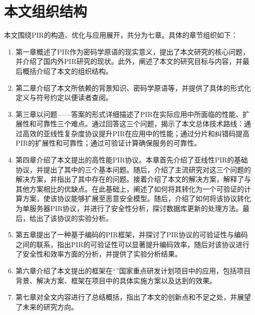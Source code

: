 \section{本文组织结构}

本文围绕PIR的构造、优化与应用展开，共分为七章。具体的章节组织如下：
\begin{enumerate}
    \item 第一章概述了PIR作为密码学原语的现实意义，提出了本文研究的核心问题，并介绍了国内外PIR研究的现状。此外，阐述了本文的研究目标与内容，并最后概括介绍了本文的组织结构。
    \item 第二章介绍了本文所依赖的背景知识、密码学原语等，并提供了具体的形式化定义与符号约定以便读者查阅。
    \item 第三章以问题——答案的形式详细描述了PIR在实际应用中所面临的性能、扩展性和可靠性三个难点。通过回答这三个问题，揭示了本文总体技术路线：通过高效的亚线性复杂度协议提升PIR在应用中的性能；通过分片和纠错码提高PIR的扩展性和可靠性；通过可验证计算确保服务的可靠性。
    \item 第四章介绍了本文提出的高性能PIR协议。本章首先介绍了亚线性PIR的基础协议，并提出了其中的三个基本问题。随后，介绍了主流研究对这三个问题的解决方案，并指出了其中存在的问题。接着介绍了本文的解决方案，解释了与其他方案相比的优缺点。在此基础上，阐述了如何将其转化为一个可验证的计算方案，使该协议能够扩展至恶意安全模型。随后，介绍了如何将该协议转化为单服务器PIR协议，并进行了安全性分析，探讨数据库更新的处理方法。最后，给出了该协议的实验分析。
    \item 第五章提出了一种基于编码的PIR框架，并探讨了PIR协议的可验证性与编码之间的联系，指出PIR的可验证性可以显著提升编码效率，随后对该协议进行了安全性和效率方面的分析，并提供了实验分析结果。
    \item 第六章介绍了本文提出的框架在“\projectname”国家重点研发计划项目中的应用，包括项目背景、解决方案、框架在项目中的具体实施方案以及达到的效果。
    \item 第七章对全文内容进行了总结概括，指出了本文的创新点和不足之处，并展望了未来的研究方向。
\end{enumerate}